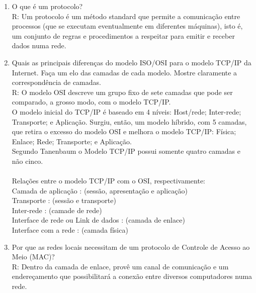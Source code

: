\documentclass{article}
\begin{document}
\begin{enumerate}
	\item O que é um protocolo?
	\\R: Um protocolo é um método standard que permite a comunicação entre processos (que se executam eventualmente em diferentes máquinas), isto é, um conjunto de regras e procedimentos a respeitar para emitir e receber dados numa rede.

	\item Quais as principais diferenças do modelo ISO/OSI para o modelo TCP/IP da Internet. Faça um
elo das camadas de cada modelo. Mostre claramente a correspondência de camadas.
	\\R: O modelo OSI
descreve um grupo fixo de sete camadas que pode ser comparado, a grosso modo, com o modelo TCP/IP.\\
O modelo inicial do TCP/IP é baseado em 4 níveis: Host/rede; Inter-rede; Transporte; e Aplicação.
Surgiu, então, um modelo híbrido, com 5 camadas, que retira o excesso do modelo OSI e melhora o
modelo TCP/IP: Física; Enlace; Rede; Transporte; e Aplicação.\\ Segundo Tanenbaum o Modelo TCP/IP
possui somente quatro camadas e não cinco.
	\\ \\
	Relações entre o modelo TCP/IP com o OSI, respectivamente:\\
	Camada de aplicação : (sessão, apresentação e aplicação) \\
	Transporte : (sessão e transporte)\\
	Inter-rede : (camade de rede) \\
	Interface de rede ou Link de dados : (camada de enlace)\\
	Interface com a rede : (camada física)

	\item Por que as redes locais necessitam de um protocolo de Controle de Acesso ao Meio (MAC)?
	\\R: Dentro da camada de enlace, provê um canal de comunicação e um endereçamento que
possibilitará a conexão entre diversos computadores numa rede.


\end{enumerate}
\end{document}

